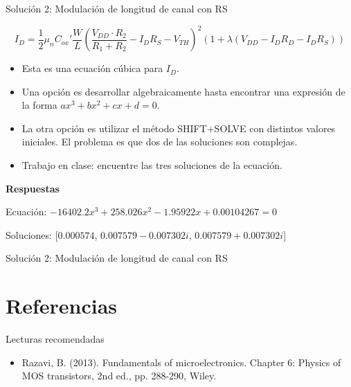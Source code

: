 \documentclass[t,10pt,aspectratio=169]{beamer}
\begin{document}
\begin{frame}{Solución 2: Modulación de longitud de canal con RS}

\[ I_D = \dfrac{1}{2} \mu_n C_{ox}' \dfrac{W}{L} \left( \dfrac{V_{DD} \cdot R_2}{R_1 + R_2} - I_D R_S - V_{TH} \right)^2 \left(1 + \lambda (V_{DD} - I_D R_D - I_D R_S) \right) \]

\begin{itemize}
    \item Esta es una ecuación cúbica para $I_D$.
    \item Una opción es desarrollar algebraicamente hasta encontrar una expresión de la forma $ax^3 + bx^2 + cx + d = 0$.
    \item La otra opción es utilizar el método SHIFT+SOLVE con distintos valores iniciales. El problema es que dos de las soluciones son complejas.
    \vspace{5mm}
    \item Trabajo en clase: encuentre las tres soluciones de la ecuación.
\end{itemize}

\vspace{5mm}
\textbf{Respuestas}

Ecuación: $-16402.2x^3 + 258.026x^2 - 1.95922x + 0.00104267 = 0$

Soluciones: [$0.000574$, $0.007579 - 0.007302i$, $0.007579 + 0.007302i$]


\end{frame}


\begin{frame}{Solución 2: Modulación de longitud de canal con RS}

\end{frame}




\section{Referencias}
\begin{frame}{Lecturas recomendadas}

\begin{itemize}
    \item Razavi, B. (2013). Fundamentals of microelectronics. Chapter 6: Physics of MOS transistors, 2nd ed., pp. 288-290, Wiley.
\end{itemize}

\end{frame}
\end{document}
